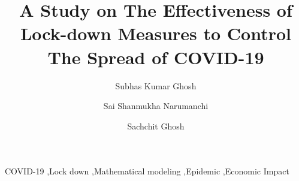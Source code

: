 \documentclass[preprint,authoryear,12pt]{elsarticle}
\begin{document}
	
	\begin{frontmatter}
		
		
		
		\title{A Study on The Effectiveness of Lock-down Measures to Control The Spread of COVID-19}
		
		
		\author[a1]{Subhas Kumar Ghosh}
		\author[a2]{Sai Shanmukha Narumanchi}
		\author[a3]{Sachchit Ghosh}
		
		\address[a1]{Commonwealth Bank of Australia, Sydney, New South Wales, 2000, Australia}
		\address[a2]{Department of Computer Science, Southern Illinois University, Carbondale, IL 62901, USA.}
		\address[a3]{The University of Sydney, Camperdown, NSW 2006, Australia}
		
		\begin{abstract}
			
		\end{abstract}
		
		\begin{keyword}
			COVID-19 \sep Lock down \sep Mathematical modeling \sep Epidemic \sep Economic Impact
			
			
		\end{keyword}
		
	\end{frontmatter}
	
\end{document}
